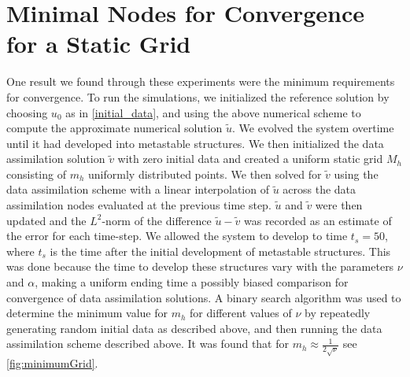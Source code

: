 \documentclass[12pt]{amsart}
\theoremstyle{plain}
\theoremstyle{definition}
\theoremstyle{remark}
\numberwithin{equation}{section} %
\numberwithin{figure}{section}   %
\begin{document}
\section{Minimal Nodes for Convergence for a Static Grid}\label{sec:static}
One result we found through these experiments were the minimum requirements for convergence. To run the simulations, we initialized the reference solution  by choosing $u_0$ as in \eqref{initial_data}, and using the above numerical scheme to compute the approximate numerical solution $\tilde{u}$.  We evolved the system overtime until it had developed into metastable structures. We then initialized the data assimilation solution $\tilde{v}$ with zero initial data and created a uniform static grid $M_h$ consisting of $m_h$ uniformly distributed points. We then solved for $\tilde{v}$ using the data assimilation scheme with a linear interpolation of $\tilde{u}$ across the data assimilation nodes evaluated at the previous time step. $\tilde{u}$ and $\tilde{v}$ were then updated and the $L^2$-norm of the difference $\tilde{u}-\tilde{v}$ was recorded as an estimate of the error for each time-step. We allowed the system to develop to time $t_s = 50$, where $t_s$ is the time after the initial development of metastable structures. This was done because the time to develop these structures vary with the parameters $\nu$ and $\alpha$, making a uniform ending time a possibly biased comparison for convergence of data assimilation solutions. A binary search algorithm was used to determine the minimum value for $m_h$ for different values of $\nu$ by repeatedly generating random initial data as described above, and then running the data assimilation scheme described above. It was found that for $m_h \approx \frac{1}{2\sqrt{\nu}}$ see \cref{fig:minimumGrid}.
\end{document}
